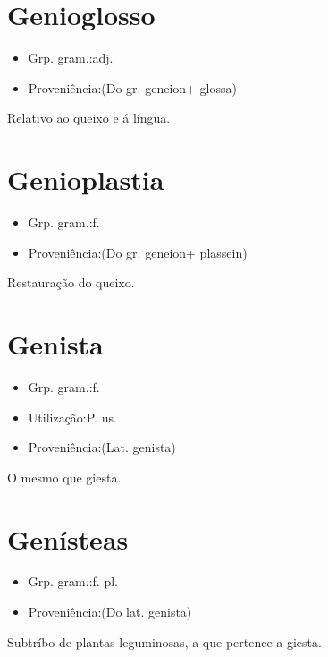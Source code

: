 \section{Genioglosso}
\begin{itemize}
\item {Grp. gram.:adj.}
\end{itemize}
\begin{itemize}
\item {Proveniência:(Do gr. \textunderscore geneion\textunderscore  + \textunderscore glossa\textunderscore )}
\end{itemize}
Relativo ao queixo e á língua.
\section{Genioplastia}
\begin{itemize}
\item {Grp. gram.:f.}
\end{itemize}
\begin{itemize}
\item {Proveniência:(Do gr. \textunderscore geneion\textunderscore  + \textunderscore plassein\textunderscore )}
\end{itemize}
Restauração do queixo.
\section{Genista}
\begin{itemize}
\item {Grp. gram.:f.}
\end{itemize}
\begin{itemize}
\item {Utilização:P. us.}
\end{itemize}
\begin{itemize}
\item {Proveniência:(Lat. \textunderscore genista\textunderscore )}
\end{itemize}
O mesmo que \textunderscore giesta\textunderscore .
\section{Genísteas}
\begin{itemize}
\item {Grp. gram.:f. pl.}
\end{itemize}
\begin{itemize}
\item {Proveniência:(Do lat. \textunderscore genista\textunderscore )}
\end{itemize}
Subtríbo de plantas leguminosas, a que pertence a giesta.

